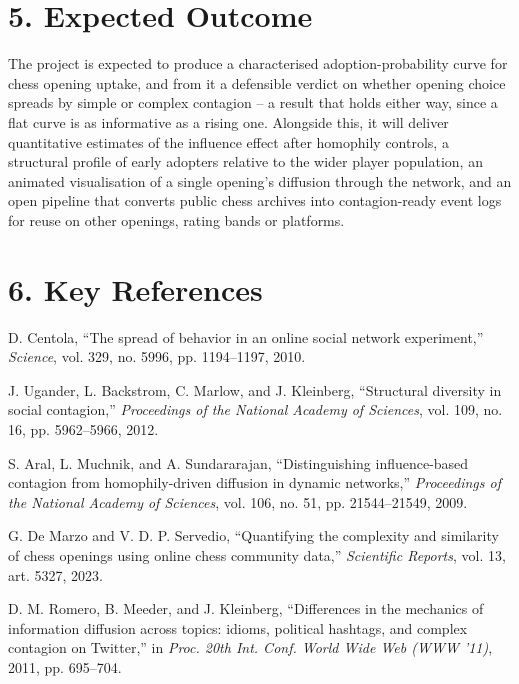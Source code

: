 \documentclass[11pt,a4paper]{article}
\begin{document}
\section*{5. Expected Outcome}

The project is expected to produce a characterised adoption-probability curve
for chess opening uptake, and from it a defensible verdict on whether opening
choice spreads by simple or complex contagion -- a result that holds either way,
since a flat curve is as informative as a rising one. Alongside this, it will
deliver quantitative estimates of the influence effect after homophily controls,
a structural profile of early adopters relative to the wider player population,
an animated visualisation of a single opening's diffusion through the network,
and an open pipeline that converts public chess archives into contagion-ready
event logs for reuse on other openings, rating bands or platforms.

\section*{6. Key References}

\begin{enumerate}[label={[\arabic*]}]
    \item D. Centola, ``The spread of behavior in an online social network
    experiment,'' \textit{Science}, vol. 329, no. 5996, pp. 1194--1197, 2010.

    \item J. Ugander, L. Backstrom, C. Marlow, and J. Kleinberg, ``Structural
    diversity in social contagion,'' \textit{Proceedings of the National Academy
    of Sciences}, vol. 109, no. 16, pp. 5962--5966, 2012.

    \item S. Aral, L. Muchnik, and A. Sundararajan, ``Distinguishing
    influence-based contagion from homophily-driven diffusion in
    dynamic networks,'' \textit{Proceedings of the National Academy
    of Sciences}, vol. 106, no. 51, pp. 21544--21549, 2009.

    \item G. De Marzo and V. D. P. Servedio, ``Quantifying the complexity and
    similarity of chess openings using online chess community data,''
    \textit{Scientific Reports}, vol. 13, art. 5327, 2023.

    \item D. M. Romero, B. Meeder, and J. Kleinberg, ``Differences in the
    mechanics of information diffusion across topics: idioms, political
    hashtags, and complex contagion on Twitter,'' in \textit{Proc. 20th Int.
    Conf. World Wide Web (WWW '11)}, 2011, pp. 695--704.
\end{enumerate}
\end{document}
